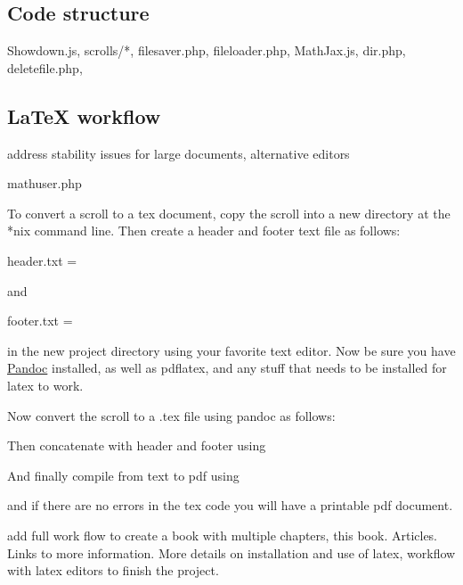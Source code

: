 \subsection{Code structure}\label{code-structure}

Showdown.js, scrolls/*, filesaver.php, fileloader.php, MathJax.js,
dir.php, deletefile.php,

\subsection{LaTeX workflow}\label{latex-workflow}

address stability issues for large documents, alternative editors

mathuser.php

To convert a scroll to a tex document, copy the scroll into a new
directory at the *nix command line. Then create a header and footer text
file as follows:

header.txt =

and

footer.txt =

in the new project directory using your favorite text editor. Now be
sure you have \href{https://pandoc.org/}{Pandoc} installed, as well as
pdflatex, and any stuff that needs to be installed for latex to work.

Now convert the scroll to a .tex file using pandoc as follows:

Then concatenate with header and footer using

And finally compile from text to pdf using

and if there are no errors in the tex code you will have a printable pdf
document.

add full work flow to create a book with multiple chapters, this book.
Articles. Links to more information. More details on installation and
use of latex, workflow with latex editors to finish the project.
